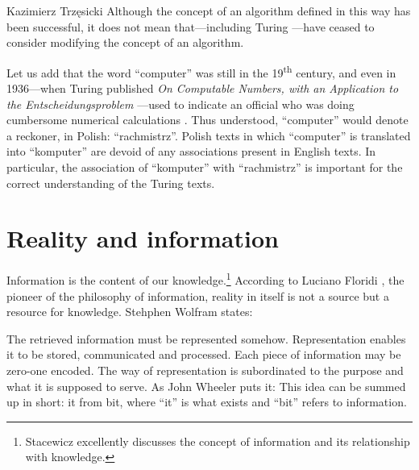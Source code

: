 \begin{artengenv}{Kazimierz Trzęsicki}
Although the concept of an algorithm defined in this way has been successful, it does not mean that---including Turing \parencite*{Turing1950}---have ceased to consider modifying the concept of an algorithm.

Let us add that the word ``computer'' was still in the 19\textsuperscript{th} century, and even in 1936---when Turing published \emph{On Computable Numbers, with an Application to the {E}ntscheidungsproblem} \parencite*{Turing1936}---used to indicate an official who was doing cumbersome numerical calculations \parencite[p.446]{CopelandSprevakShagrir2017}. Thus understood, ``computer'' would denote a reckoner, in Polish: ``rachmistrz''. Polish texts in which ``computer'' is translated into ``komputer'' are devoid of any associations present in English texts. In particular, the association of ``komputer'' with ``rachmistrz'' is important for the correct understanding of the  Turing texts.
\enlargethispage{1.5\baselineskip}



\section{Reality and information} 
Information is the content of our knowledge.\footnote{Stacewicz \parencite*[\S 1]{MarciszewskiStacewicz2011} excellently discusses the concept of information and its relationship with knowledge.}
According to Luciano Floridi \parencite*{Floridi2008}, the pioneer of the philosophy of information, reality in itself is not a source but a resource for knowledge.  Stehphen Wolfram \parencite*[p.389]{Wolfram2002} states:

 The retrieved information must be represented somehow. Representation enables it to be stored, communicated and processed. Each piece of information may be zero-one encoded. The way of representation is subordinated to the purpose and what it is supposed to serve. As John Wheeler \parencite*{Wheeler1989} puts it:  This idea can be summed up in short: it from bit, where ``it'' is what exists and ``bit'' refers to information.


\end{artengenv}
